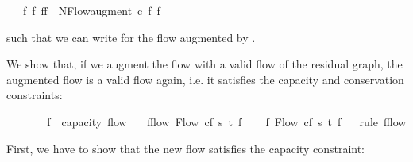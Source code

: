 \begin{isabellebody}
\ \ \ {\isachardoublequoteopen}{\isasymAnd}f\ f{\isacharprime}{\isachardot}\ f{\isasymup}f{\isacharprime}\ {\isasymequiv}\ NFlow{\isachardot}augment\ c\ f\ f{\isacharprime}{\isachardoublequoteclose}%
\begin{isamarkuptext}%
such that we can write  for the flow  
  augmented by .%
\end{isamarkuptext}\isamarkuptrue%
%
\isamarkuptrue%
%
\begin{isamarkuptext}%
We show that, if we augment the flow with a valid flow of
  the residual graph, the augmented flow is a valid flow again, i.e. 
  it satisfies the capacity and conservation constraints:%
\end{isamarkuptext}\isamarkuptrue%
\isamarkupfalse%
\ \isanewline
\ \ %
\isanewline
\ \ \ f{\isacharprime}\ {\isacharcolon}{\isacharcolon}\ {\isachardoublequoteopen}{\isacharprime}capacity\ flow{\isachardoublequoteclose}\isanewline
\ \ \ f{\isacharprime}{\isacharunderscore}flow{\isacharcolon}\ {\isachardoublequoteopen}Flow\ cf\ s\ t\ f{\isacharprime}{\isachardoublequoteclose}\isanewline
{}\ \ \isanewline
\isanewline
{}\isamarkupfalse%
\ f{\isacharprime}{\isacharcolon}\ Flow\ cf\ s\ t\ f{\isacharprime}%
\isadelimproof
\ %
\endisadelimproof
%
\isatagproof
{}\isamarkupfalse%
\ {\isacharparenleft}rule\ f{\isacharprime}{\isacharunderscore}flow{\isacharparenright}%
\endisatagproof
{\isafoldproof}%
%
\isadelimproof
%
\endisadelimproof
%
\isamarkuptrue%
%
\begin{isamarkuptext}%
First, we have to show that the new flow satisfies the capacity constraint:%
\end{isamarkuptext}\isamarkuptrue%
%
\end{isabellebody}
